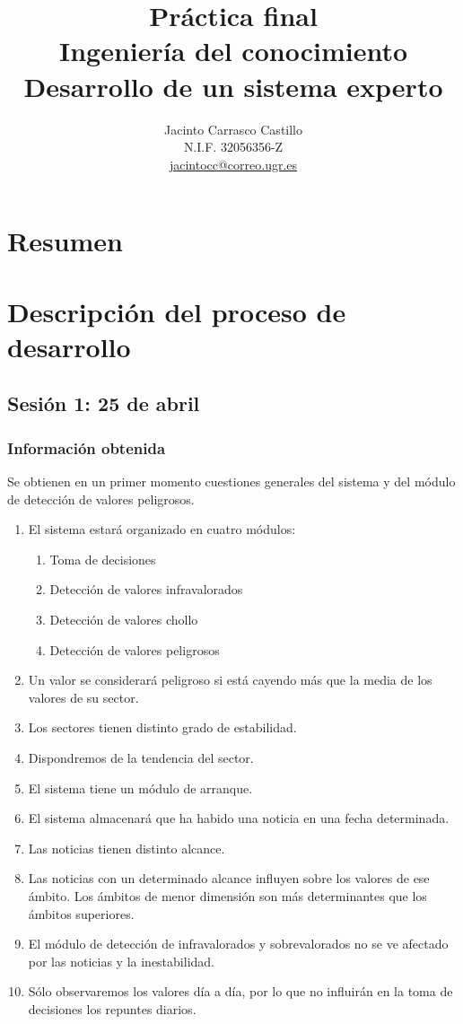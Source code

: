 \documentclass[11pt,leqno]{article}
\title{Práctica final\\
		Ingeniería del conocimiento\\
		Desarrollo de un sistema experto}
\author{Jacinto Carrasco Castillo 	\\
		N.I.F. 32056356-Z			\\ 
		\href{jacintocc@correo.ugr.es}{jacintocc@correo.ugr.es}}
\theoremstyle{definition_wo_parentheses}
\theoremstyle{plain}
\theoremstyle{remark}
\begin{document}
\maketitle

\tableofcontents

\section{Resumen}

\section{Descripción del proceso de desarrollo}

\subsection{Sesión 1: 25 de abril}

\subsubsection{Información obtenida}

	Se obtienen en un primer momento cuestiones generales del sistema y del módulo de detección de valores peligrosos.	
	
\begin{enumerate}
\item El sistema estará organizado en cuatro módulos:
	\begin{enumerate}[I]
	\item Toma de decisiones
	\item Detección de valores infravalorados
	\item Detección de valores chollo
	\item Detección de valores peligrosos
\end{enumerate}
\item Un valor se considerará peligroso si está cayendo más que la media de los valores de su sector.
\item Los sectores tienen distinto grado de estabilidad.
\item Dispondremos de la tendencia del sector.
\item El sistema tiene un módulo de arranque.
\item El sistema almacenará que ha habido una noticia en una fecha determinada.
\item Las noticias tienen distinto alcance. 
\item Las noticias con un determinado alcance influyen sobre los valores de ese ámbito. Los ámbitos de menor dimensión son más determinantes que los ámbitos superiores.
\item El módulo de detección de infravalorados y sobrevalorados no se ve afectado por las noticias y la inestabilidad.
\item Sólo observaremos los valores día a día, por lo que no influirán en la toma de decisiones los repuntes diarios.
\end{enumerate}
	
\end{document}

